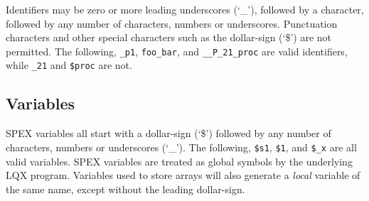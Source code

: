 Identifiers may be zero or more leading underscores
(`\_'), followed by a character, followed by any number of characters,
numbers or underscores. Punctuation characters and other special
characters such as the dollar-sign (`\$') are not permitted.  The
following, {\tt \_p1}, {\tt foo\_bar}, and {\tt \_\_P\_21\_proc} are
valid identifiers, while {\tt \_21} and {\tt \$proc} are not.

\subsection{Variables}

SPEX variables all start with a dollar-sign (`\$') followed by any number of characters, numbers or
underscores (`\_').  The following, \texttt{\$s1}, \texttt{\$1}, and \texttt{\$\_x} are all valid variables.
SPEX variables are treated as global symbols by the underlying LQX program.  Variables used to store arrays
will also generate a \emph{local} variable of the same name, except without the leading dollar-sign.  

